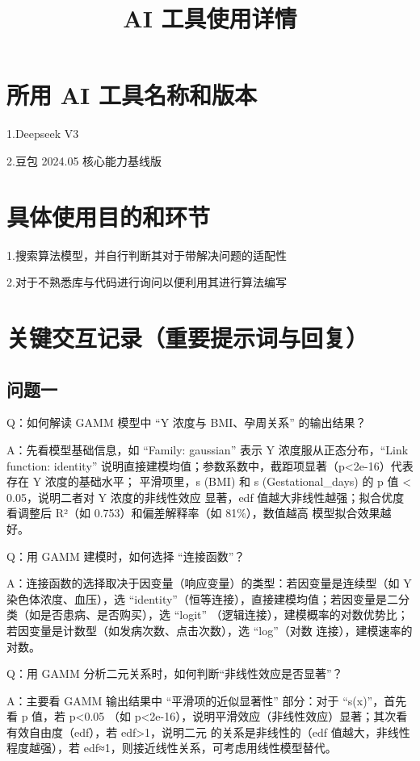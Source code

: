 \documentclass{article}
\date{}
\title{\textbf{AI 工具使用详情}}
\begin{document}
\maketitle
\section{所用 AI 工具名称和版本}
1.Deepseek V3

2.豆包 2024.05 核心能力基线版

\section{具体使用目的和环节}
1.搜索算法模型，并自行判断其对于带解决问题的适配性

2.对于不熟悉库与代码进行询问以便利用其进行算法编写

\section{关键交互记录（重要提示词与回复）}
\subsection{问题一}
Q：如何解读 GAMM 模型中 “Y 浓度与 BMI、孕周关系” 的输出结果？

A：先看模型基础信息，如 “Family: gaussian” 表示 Y 浓度服从正态分布，“Link function:
identity” 说明直接建模均值；参数系数中，截距项显著（p<2e-16）代表存在 Y 浓度的基础水平；
平滑项里，s (BMI) 和 s (Gestational\_days) 的 p 值 < 0.05，说明二者对 Y 浓度的非线性效应
显著，edf 值越大非线性越强；拟合优度看调整后 R²（如 0.753）和偏差解释率（如 81\%），数值越高
模型拟合效果越好。

Q：用 GAMM 建模时，如何选择 “连接函数”？

A：连接函数的选择取决于因变量（响应变量）的类型：若因变量是连续型（如 Y 染色体浓度、血压），选
“identity”（恒等连接），直接建模均值；若因变量是二分类（如是否患病、是否购买），选 “logit”
（逻辑连接），建模概率的对数优势比；若因变量是计数型（如发病次数、点击次数），选 “log”（对数
连接），建模速率的对数。

Q：用 GAMM 分析二元关系时，如何判断“非线性效应是否显著”？

A：主要看 GAMM 输出结果中 “平滑项的近似显著性” 部分：对于 “s(x)”，首先看 p 值，若 p<0.05
（如 p<2e-16），说明平滑效应（非线性效应）显著；其次看有效自由度（edf），若 edf>1，说明二元
的关系是非线性的（edf 值越大，非线性程度越强），若 edf≈1，则接近线性关系，可考虑用线性模型替代。
\end{document}
